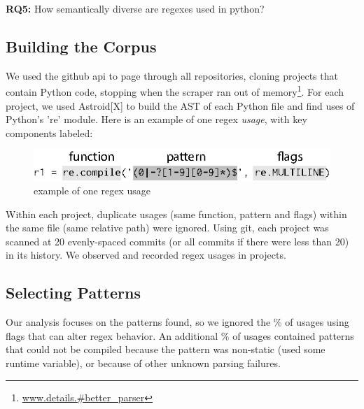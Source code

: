 \textbf{RQ5:} How semantically diverse are regexes used in python?




\subsection{Building the Corpus}
\label{study:corpus}
We used the github api to page through all repositories, cloning projects that contain Python code, stopping when the scraper ran out of memory\footnote{\url{www.details.#better_parser}}.  For each project, we used Astroid[X] to build the AST of each Python file and find uses of Python's 're' module.  Here is an example of one regex \emph{usage}, with key components labeled:

\begin{figure}[htb]
\centering
\includegraphics[width=\columnwidth]{../illustrations/exampleUsage.eps}
\caption{example of one regex usage}
\label{fig:exampleUsage}
\end{figure}

Within each project, duplicate usages (same function, pattern and flags) within the same file (same relative path) were ignored.  Using git, each project was scanned at 20 evenly-spaced commits (or all commits if there were less than 20) in its history.  We observed and recorded  regex usages in  projects.

\subsection{Selecting Patterns}
Our analysis focuses on the patterns found, so we ignored the \%  of usages using flags that can alter regex behavior.  An additional \% of usages contained patterns that could not be compiled because the pattern was non-static (used some runtime variable), or because of other unknown parsing failures.

